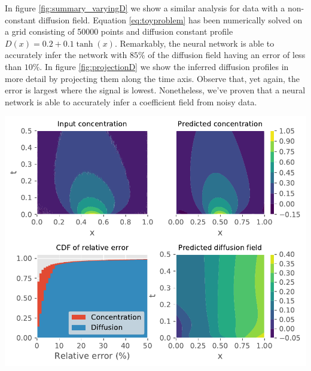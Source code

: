 \documentclass{Dissertate}
\let\origfigure\figure
\let\endorigfigure\endfigure
\renewenvironment{figure}[1][2] {
    \expandafter\origfigure\expandafter[H]
} {
    \endorigfigure
}
\begin{document}
In figure \ref{fig:summary_varyingD} we show a similar analysis for
data with a non-constant diffusion field. Equation
\ref{eq:toyproblem} has been numerically solved on a grid consisting
of 50000 points and diffusion constant profile
\(D(x) = 0.2 + 0.1\tanh(x)\). Remarkably, the neural network is able to
accurately infer the network with \(85\%\) of the diffusion field having
an error of less than \(10\%\). In figure \ref{fig:projectionD} we
show the inferred diffusion profiles in more detail by projecting them
along the time axis. Observe that, yet again, the error is largest where
the signal is lowest. Nonetheless, we've proven that a neural network is
able to accurately infer a coefficient field from noisy data.

\begin{figure}
\hypertarget{fig:summary_varyingD}{%
\centering
\includegraphics{source/figures/pdf/summary_varyingD_varyingPINN.pdf}
\caption{We show the training data and predicted concentration profile
in the upper left and right panels. The lower right panel shows the
inferred diffusion field while the lower left panel shows the CDF of the
relative error of the diffusion and
concentration.}\label{fig:summary_varyingD}
}
\end{figure}
\end{document}
